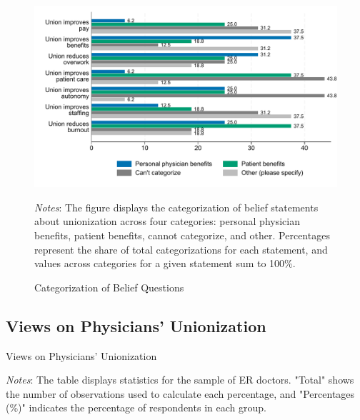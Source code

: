 \documentclass[11pt]{article}
\theoremstyle{definition}
\begin{document}
\begin{figure}[H]
	\centering
	\caption{Categorization of Belief Questions}
	\label{fig:cat_belief}
	\begin{adjustbox}{max width=\textwidth}
		\includegraphics{Pre-Survey/figures/cat_statements_outtype_ER.pdf}
	\end{adjustbox}
	\parbox{.9\linewidth}{
		\vspace{.2cm}
		\scriptsize{\emph{Notes}: The figure displays the categorization of belief statements about unionization across four categories: personal physician benefits, patient benefits, cannot categorize, and other. Percentages represent the share of total categorizations for each statement, and values across categories for a given statement sum to 100\%.}
	}
\end{figure}



\subsection{Views on Physicians' Unionization} 

\begin{table}[H]
    \centering
    \caption{Views on Physicians' Unionization}
        \begin{adjustbox}{width=1\linewidth} 

\end{adjustbox}
     \parbox{\linewidth}{
        	\vspace{.2cm}
        		\scriptsize{\scriptsize{{\emph{Notes}: The table displays statistics for the sample of ER doctors. "Total" shows the number of observations used to calculate each percentage, and "Percentages (\%)" indicates the percentage of respondents in each group. }}}}
    \label{tab:ai_table}
\end{table}
\end{document}
